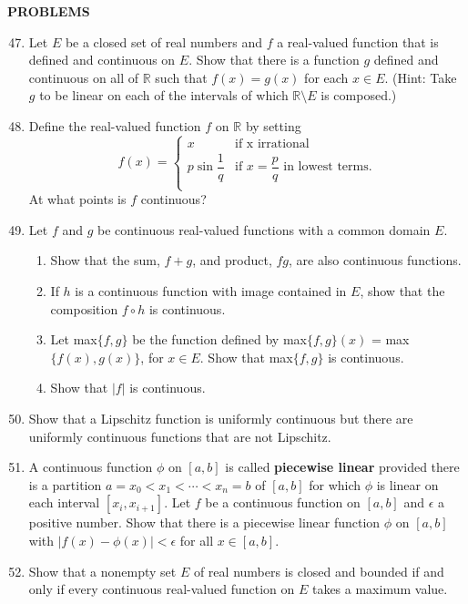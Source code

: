 \begin{center}
	\textbf{PROBLEMS}
\end{center}
\begin{enumerate}
	\setcounter{enumi}{46}
	\item Let $E$ be a closed set of real numbers and $f$ a real-valued function that is defined and continuous on $E$. Show that there is a function $g$ defined and continuous on all of $\mathbb{R}$ such that $f(x) = g(x)$ for each $x \in E$. (Hint: Take $g$ to be linear on each of the intervals of which $\mathbb{R} \setminus E$ is composed.)
	\item Define the real-valued function $f$ on $\mathbb{R}$ by setting 
	\[ 
	f(x) =
	\begin{cases} 
		x & \text{if x irrational}\\
		p \sin \dfrac{1}{q} & \text{if } x = \dfrac{p}{q} \text{ in lowest terms.} \\
	\end{cases}
	\]
	At what points is $f$ continuous?
	\item Let $f$ and $g$ be continuous real-valued functions with a common domain $E$.
	\begin{enumerate}[label=(\roman*),align=left]
        \item Show that the sum, $f+g$, and product, $fg$, are also continuous functions.
        \item If $h$ is a continuous function with image contained in $E$, show that the composition $f \circ h$ is continuous.
        \item Let max$\{f,g\}$ be the function defined by max$\{f,g\}(x)$ = max$\{f(x),g(x)\}$, for $x \in E$. Show that max$\{f,g\}$ is continuous.
        \item Show that $|f|$ is continuous.
    \end{enumerate}
	\item Show that a Lipschitz function is uniformly continuous but there are uniformly continuous functions that are not Lipschitz.
	\item A continuous function $\phi$ on $[a,b]$ is called \textbf{piecewise linear} provided there is a partition $a=x_0<x_1< \cdots <x_n = b$ of $[a,b]$ for which $\phi$ is linear on each interval $[x_i, x_{i+1}]$. Let $f$ be a continuous function on $[a,b]$ and $\epsilon$ a positive number. 
	Show that there is a piecewise linear function $\phi$ on $[a,b]$ with $|f(x)-\phi (x)| < \epsilon$ for all $x \in [a,b]$.
	\item Show that a nonempty set $E$ of real numbers is closed and bounded if and only if every continuous real-valued function on $E$ takes a maximum value.

\end{enumerate}

